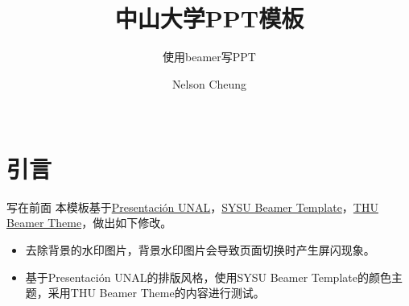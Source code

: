 \documentclass{libs/format}
\title[sysu ppt template]{中山大学PPT模板}
\subtitle{使用beamer写PPT}
\institute[Sun Yat-Sen University]{
  计算机学院 \\ 
  中山大学}
\date[\ctoday]{\ctoday}
\begin{document}


\author[Nelson Cheung]{
  Nelson Cheung \\\medskip
  {} \\
  {}
}

\begin{frame}
  \titlepage
\end{frame}
\setcounter{framenumber}{0}

\begin{frame}
  \tableofcontents[sectionstyle=show,subsectionstyle=show/shaded/hide,subsubsectionstyle=show/shaded/hide]
  \addtocounter{framenumber}{-1}
\end{frame}



\section{引言}

\begin{frame}{写在前面}
  本模板基于\href{https://www.overleaf.com/latex/templates/presentacion-unal/nzfkbkgnctfp}{Presentación UNAL}，\href{https://github.com/yxnchen/sysu-beamer-template}{SYSU Beamer Template}，\href{https://www.overleaf.com/latex/templates/thu-beamer-theme/vwnqmzndvwyb}{THU Beamer Theme}，做出如下修改。
  \begin{itemize}
    \item 去除背景的水印图片，背景水印图片会导致页面切换时产生屏闪现象。
    \item 基于Presentación UNAL的排版风格，使用SYSU Beamer Template的颜色主题，采用THU Beamer Theme的内容进行测试。
  \end{itemize}
\end{frame}
\end{document}
